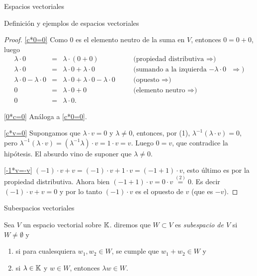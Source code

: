 \begin{chapter}{Espacios vectoriales}
\begin{section}{Definici\'on y ejemplos de espacios vectoriales}
\begin{proof}
                \ref{c*0=0} Como $0$ es el elemento neutro de la suma en $V$, entonces $0 = 0 +0$, luego 
                \begin{equation*}
                    \begin{array}{rllll}
                    \lambda\cdot 0 &=& \lambda\cdot (0+0)&\quad&\text{(propiedad distributiva $\Rightarrow$)}  \\
                    \lambda\cdot 0&=& \lambda\cdot 0 + \lambda\cdot 0 && \text{(sumando a la izquierda $-\lambda\cdot 0$ $\Rightarrow$)} \\
                \lambda\cdot 0 - \lambda\cdot 0 &=& \lambda\cdot 0 + \lambda\cdot 0 -\lambda\cdot 0 && \text{(opuesto $\Rightarrow$)}\\
                    0 &=& \lambda\cdot 0 +0  &&\text{(elemento neutro $\Rightarrow$)}\\
                    0 &=& \lambda\cdot 0.
                    \end{array}
                \end{equation*}
                
                \ref{0*c=0} Análoga a \ref{c*0=0}.
                
                \ref{c*v=0} Supongamos que  $\lambda\cdot v=0$ y  $\lambda \ne 0$, entonces, por (1), $ \lambda^{-1}(\lambda\cdot v)=0$, pero $\lambda^{-1}(\lambda\cdot v) = (\lambda^{-1}\lambda)\cdot v = 1\cdot v = v$. Luego $0=v$,  que contradice la hipótesis. El absurdo vino de suponer que $\lambda \ne 0$.
                
                \ref{-1*v=-v}  $(-1)\cdot v +v = (-1)\cdot v +1\cdot v = (-1+1)\cdot v$,  esto último es por la propiedad distributiva. Ahora bien $(-1+1)\cdot v = 0\cdot v \overset{(2)}{=} 0$. Es decir   $(-1)\cdot v +v = 0$ y por lo tanto  $(-1)\cdot v$ es el opuesto de $v$ (que es $-v$).  
            
            \end{proof}
   
\end{section}
    
\begin{section}{Subespacios vectoriales}\label{seccion-subespacios-vectoriales}
    \begin{definicion}
        Sea $V$ un espacio vectorial sobre $\mathbb K$. diremos que $W \subset V$ es \textit{subespacio de $V$} si $W \not= \emptyset$ y
        \begin{enumerate}[label=\textit{\alph*)},ref=\textit{\alph*)}]
            \item\label{def-sub-a} si para cualesquiera $w_1,w_2 \in W$, se cumple que $w_1+w_2 \in W$ y
            \item\label{def-sub-b} si $\lambda \in \mathbb K$ y  $w \in W$, entonces $\lambda w \in W$.
        \end{enumerate}
    \end{definicion}


\end{section}
\end{chapter}
